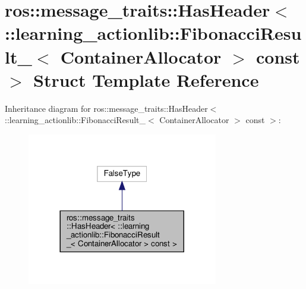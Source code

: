 \hypertarget{structros_1_1message__traits_1_1HasHeader_3_01_1_1learning__actionlib_1_1FibonacciResult___3_01Ca41b3879311b91530ab1f3f2cb305293}{}\section{ros\+:\+:message\+\_\+traits\+:\+:Has\+Header$<$ \+:\+:learning\+\_\+actionlib\+:\+:Fibonacci\+Result\+\_\+$<$ Container\+Allocator $>$ const $>$ Struct Template Reference}
\label{structros_1_1message__traits_1_1HasHeader_3_01_1_1learning__actionlib_1_1FibonacciResult___3_01Ca41b3879311b91530ab1f3f2cb305293}


Inheritance diagram for ros\+:\+:message\+\_\+traits\+:\+:Has\+Header$<$ \+:\+:learning\+\_\+actionlib\+:\+:Fibonacci\+Result\+\_\+$<$ Container\+Allocator $>$ const $>$\+:
\nopagebreak
\begin{figure}[H]
\begin{center}
\leavevmode
\includegraphics[width=236pt]{structros_1_1message__traits_1_1HasHeader_3_01_1_1learning__actionlib_1_1FibonacciResult___3_01C65808e03874e05fbcc05cf0e2d8e3c92}
\end{center}
\end{figure}


